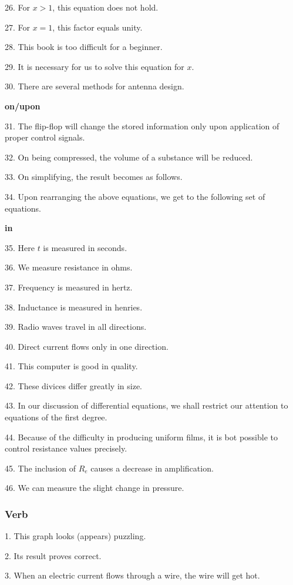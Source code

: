 \documentclass[a4paper,twocolumn,10pt]{article}
\begin{document}
\begin{CJK}{UTF8}{gkai}
	26. For $x>1$, this equation does not hold.

	27. For $x=1$, this factor equals unity.

	28. This book is too difficult for a beginner.

	29. It is necessary for us to solve this equation for $x$.

	30. There are several methods for antenna design.

	{\bf on/upon}

	31. The flip-flop will change the stored information only upon application of proper
	control signals.

	32. On being compressed, the volume of a substance will be reduced.

	33. On simplifying, the result becomes as follows.

	34. Upon rearranging the above equations, we get to the following set of equations.

	{\bf in}

	35. Here $t$ is measured in seconds.

	36. We measure resistance in ohms.

	37. Frequency is measured in hertz.

	38. Inductance is measured in henries.

	39. Radio waves travel in all directions.

	40. Direct current flows only in one direction.

	41. This computer is good in quality.

	42. These divices differ greatly in size.

	43. In our discussion of differential equations, we shall
	restrict our attention to equations of the first degree.

	44. Because of the difficulty in producing uniform films, it is bot possible to control resistance
	values precisely.

	45. The inclusion of $R_e$ causes a decrease in amplification.

	46. We can measure the slight change in pressure.

	\subsubsection{Verb}

	1. This graph looks (appears) puzzling.

	2. Its result proves correct.

	3. When an electric current flows through a wire, the wire will get hot.


\end{CJK}
\end{document}
